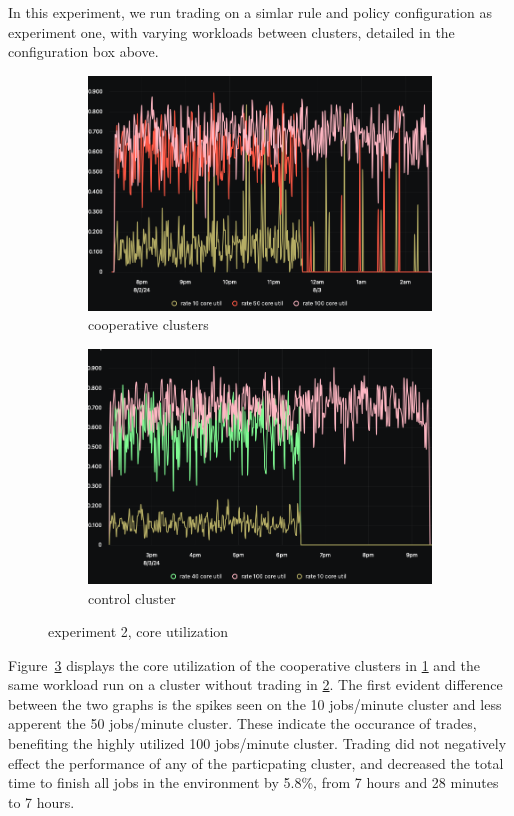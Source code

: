 In this experiment, we run trading on a simlar rule and policy configuration as
experiment one, with varying workloads between clusters, detailed in the
configuration box above. 

\begin{figure}[H]
\centering
\begin{subfigure}{.5\textwidth}
  \centering
  \includegraphics[width=.9\linewidth]{./figures/experiment-two/trading.png}
  \caption{cooperative clusters}
  \label{fig:exp2coop}
\end{subfigure}%
\begin{subfigure}{.5\textwidth}
  \centering
  \includegraphics[width=.9\linewidth]{./figures/experiment-two/control.png}
  \caption{control cluster}
  \label{fig:exp2control}
\end{subfigure}
\caption{experiment 2, core utilization}
\label{fig:exp2coreutil}
\end{figure}

Figure~\ref{fig:exp2coreutil} displays the core utilization of the cooperative
clusters in \ref{fig:exp2coop} and the same workload run on a cluster without
trading in \ref{fig:exp2control}.
The first evident difference between the two graphs is the spikes seen on the
10 jobs/minute cluster and less apperent the 50 jobs/minute cluster. These
indicate the occurance of trades, benefiting the highly utilized 100
jobs/minute cluster. Trading did not negatively effect the performance of any
of the particpating cluster, and decreased the total time to finish all jobs in
the environment by 5.8\%, from 7 hours and 28 minutes to 7 hours.

